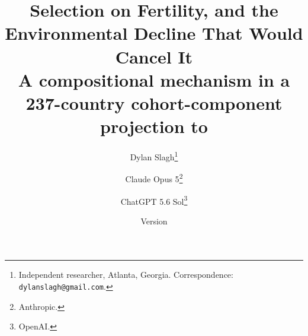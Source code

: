 \title{\textbf{Selection on Fertility, and the Environmental Decline That Would Cancel It}\\[0.35em]
\large A compositional mechanism in a 237-country cohort-component projection to \ProjectionEndYear{}}

\author{%
Dylan Slagh\thanks{Independent researcher, Atlanta, Georgia.
Correspondence: \texttt{dylanslagh@gmail.com}.}
\and
Claude Opus 5\thanks{Anthropic.}
\and
ChatGPT 5.6 Sol\thanks{OpenAI.}%
}

\date{Version \PaperVersion{} \quad\textbullet\quad \PaperDate{}}

